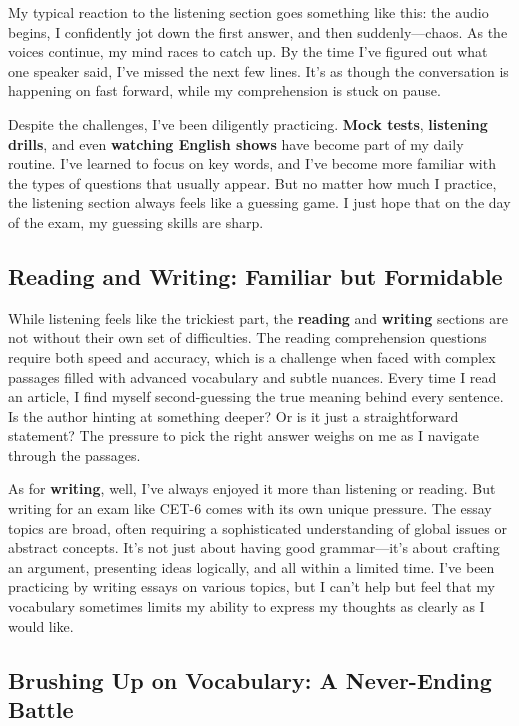 \documentclass[a4paper]{article} 	%
\begin{document}
My typical reaction to the listening section goes something like this: the audio begins, I confidently jot down the first answer, and then suddenly—chaos. As the voices continue, my mind races to catch up. By the time I’ve figured out what one speaker said, I’ve missed the next few lines. It’s as though the conversation is happening on fast forward, while my comprehension is stuck on pause.

Despite the challenges, I’ve been diligently practicing. \textbf{Mock tests}, \textbf{listening drills}, and even \textbf{watching English shows} have become part of my daily routine. I’ve learned to focus on key words, and I’ve become more familiar with the types of questions that usually appear. But no matter how much I practice, the listening section always feels like a guessing game. I just hope that on the day of the exam, my guessing skills are sharp.

\subsection*{Reading and Writing: Familiar but Formidable}

While listening feels like the trickiest part, the \textbf{reading} and \textbf{writing} sections are not without their own set of difficulties. The reading comprehension questions require both speed and accuracy, which is a challenge when faced with complex passages filled with advanced vocabulary and subtle nuances. Every time I read an article, I find myself second-guessing the true meaning behind every sentence. Is the author hinting at something deeper? Or is it just a straightforward statement? The pressure to pick the right answer weighs on me as I navigate through the passages.

As for \textbf{writing}, well, I’ve always enjoyed it more than listening or reading. But writing for an exam like CET-6 comes with its own unique pressure. The essay topics are broad, often requiring a sophisticated understanding of global issues or abstract concepts. It’s not just about having good grammar—it’s about crafting an argument, presenting ideas logically, and all within a limited time. I’ve been practicing by writing essays on various topics, but I can’t help but feel that my vocabulary sometimes limits my ability to express my thoughts as clearly as I would like.

\subsection*{Brushing Up on Vocabulary: A Never-Ending Battle}
\end{document}
